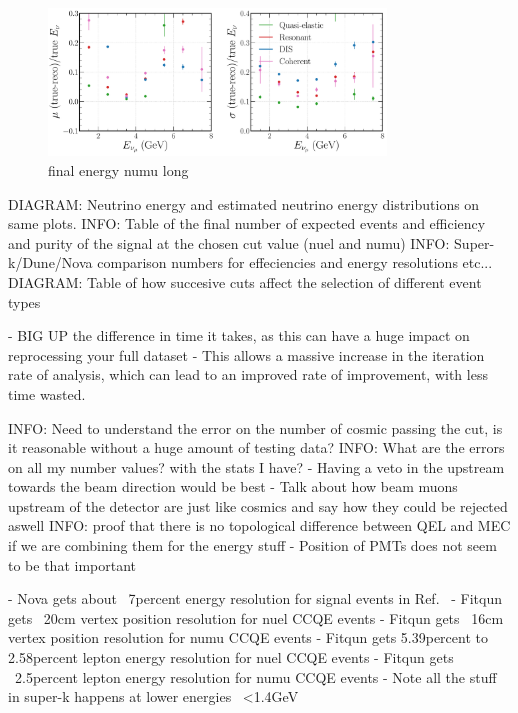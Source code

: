 \begin{figure} %
    \includegraphics[width=0.8\textwidth]{diagrams/6-cvn/chipsnet/final_energy_numu.pdf}
    \caption[final energy numu short]
    {final energy numu long}
    \label{fig:final_energy_numu}
\end{figure}

DIAGRAM: Neutrino energy and estimated neutrino energy distributions on same plots.
INFO: Table of the final number of expected events and efficiency and purity of the signal at the
chosen cut value (nuel and numu)
INFO: Super-k/Dune/Nova comparison numbers for effeciencies and energy resolutions etc...
DIAGRAM: Table of how succesive cuts affect the selection of different event types

- BIG UP the difference in time it takes, as this can have a huge impact on reprocessing your full
dataset
- This allows a massive increase in the iteration rate of analysis, which can lead to an improved
rate of improvement, with less time wasted.

INFO: Need to understand the error on the number of cosmic passing the cut, is it reasonable
without a huge amount of testing data?
INFO: What are the errors on all my number values? with the stats I have?
- Having a veto in the upstream towards the beam direction would be best
- Talk about how beam muons upstream of the detector are just like cosmics and say how they could
be rejected aswell
INFO: proof that there is no topological difference between QEL and MEC if we are combining them
for the energy stuff
- Position of PMTs does not seem to be that important

- Nova gets about ~7percent energy resolution for signal events
in Ref.~\cite{jiang2019}
- Fitqun gets ~20cm vertex position resolution for nuel CCQE events
- Fitqun gets ~16cm vertex position resolution for numu CCQE events
- Fitqun gets 5.39percent to 2.58percent lepton energy resolution for nuel CCQE events
- Fitqun gets ~2.5percent lepton energy resolution for numu CCQE events
- Note all the stuff in super-k happens at lower energies ~<1.4GeV

